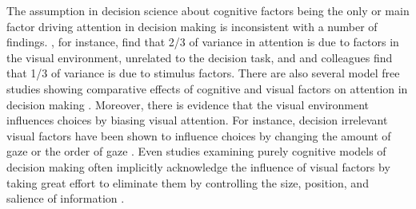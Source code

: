 \documentclass{article}
\begin{document}

The assumption in decision science about cognitive factors being the only or main factor driving attention in decision making is inconsistent with a number of findings. \cite{vanderlans2008}, for instance, find that 2/3 of variance in attention is due to factors in the visual environment, unrelated to the decision task, and \cite{towal2013a} and colleagues find that 1/3 of variance is due to stimulus factors. There are also several model free studies showing comparative effects of cognitive and visual factors on attention in decision making \citep{gidloef2017a, orquin2015a, orquin2019a}. Moreover, there is evidence that the visual environment influences choices by biasing visual attention. For instance, decision irrelevant visual factors have been shown to influence choices by changing the amount of gaze \citep{peschel2019,chandon2009a} or the order of gaze \citep{reeck2017a}. Even studies examining purely cognitive models of decision making often implicitly acknowledge the influence of visual factors by taking great effort to eliminate them by controlling the size, position, and salience of information \citep{brandstatter2014, gloeckner2011a, perkovic2018}.
\end{document}
